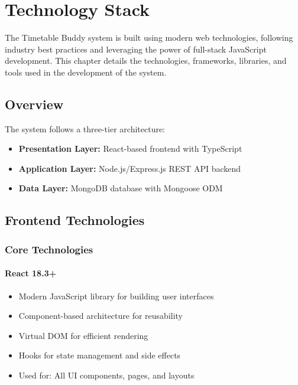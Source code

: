 \chapter{Technology Stack}

The Timetable Buddy system is built using modern web technologies, following industry best practices and leveraging the power of full-stack JavaScript development. This chapter details the technologies, frameworks, libraries, and tools used in the development of the system.

\section{Overview}

The system follows a three-tier architecture:
\begin{itemize}[leftmargin=*]
    \item \textbf{Presentation Layer:} React-based frontend with TypeScript
    \item \textbf{Application Layer:} Node.js/Express.js REST API backend
    \item \textbf{Data Layer:} MongoDB database with Mongoose ODM
\end{itemize}

\section{Frontend Technologies}

\subsection{Core Technologies}

\subsubsection{React 18.3+}
\begin{itemize}[leftmargin=*]
    \item Modern JavaScript library for building user interfaces
    \item Component-based architecture for reusability
    \item Virtual DOM for efficient rendering
    \item Hooks for state management and side effects
    \item Used for: All UI components, pages, and layouts
\end{itemize}

